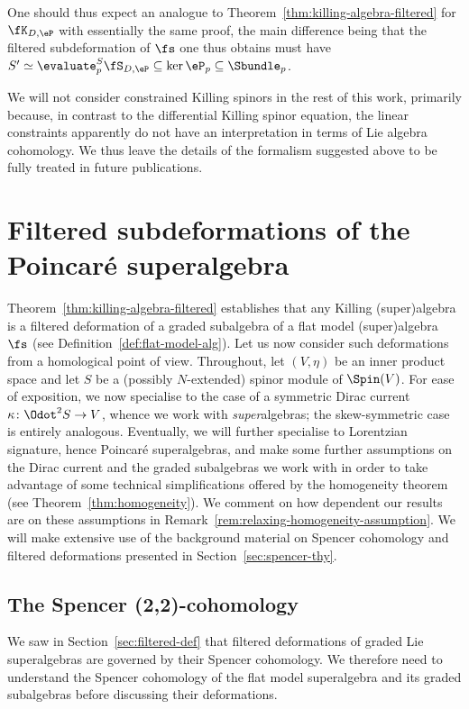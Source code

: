 One should thus expect an analogue to Theorem~\ref{thm:killing-algebra-filtered} for $\fK_{D,\eP}$ with essentially the same proof, the main difference being that the filtered subdeformation of $\fs$ one thus obtains must have $S'\simeq \evaluate^S_p\fS_{D,\eP}\subseteq\ker\eP_p\subseteq\Sbundle_p$.

We will not consider constrained Killing spinors in the rest of this work, primarily because, in contrast to the differential Killing spinor equation, the linear constraints apparently do not have an interpretation in terms of Lie algebra cohomology. We thus leave the details of the formalism suggested above to be fully treated in future publications.

\section{Filtered subdeformations of the Poincar\'e superalgebra}
\label{sec:filtered-def-poincare}

Theorem~\ref{thm:killing-algebra-filtered} establishes that any Killing (super)algebra is a filtered deformation of a graded subalgebra of a flat model (super)algebra $\fs$ (see Definition~\ref{def:flat-model-alg}). Let us now consider such deformations from a homological point of view. Throughout, let $(V,\eta)$ be an inner product space and let $S$ be a (possibly $N$-extended) spinor module of $\Spin(V)$. For ease of exposition, we now specialise to the case of a symmetric Dirac current $\kappa\colon \Odot^2 S \to V$, whence we work with \emph{super}algebras; the skew-symmetric case is entirely analogous. Eventually, we will further specialise to Lorentzian signature, hence Poincar\'e superalgebras, and make some further assumptions on the Dirac current and the graded subalgebras we work with in order to take advantage of some technical simplifications offered by the homogeneity theorem (see Theorem~\ref{thm:homogeneity}). We comment on how dependent our results are on these assumptions in Remark~\ref{rem:relaxing-homogeneity-assumption}. We will make extensive use of the background material on Spencer cohomology and filtered deformations presented in Section~\ref{sec:spencer-thy}.

\subsection{The Spencer (2,2)-cohomology}
\label{sec:poincare-spencer-22-cohomology}

We saw in Section~\ref{sec:filtered-def} that filtered deformations of graded Lie superalgebras are governed by their Spencer cohomology. We therefore need to understand the Spencer cohomology of the flat model superalgebra and its graded subalgebras before discussing their deformations.

